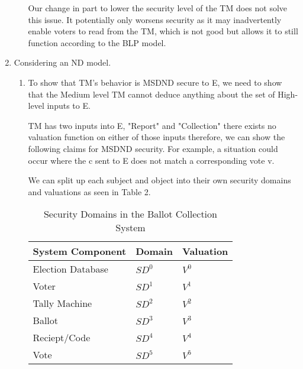 \documentclass[journal,onecolumn]{IEEEtran}
\begin{document}
\begin{enumerate}
\begin{enumerate}
      Our change in part to lower the security level of the TM does not solve this issue. It potentially only worsens security as it may inadvertently enable voters to read from the TM, which is not good but allows it to still function according to the BLP model. 
    \end{enumerate}

  \item Considering an ND model. 
    \begin{enumerate}
      \item To show that TM's behavior is MSDND secure to E, we need to show that the Medium level TM cannot deduce anything about the set of High-level inputs to E.
      
      TM has two inputs into E, "Report" and "Collection" there exists no valuation function on either of those inputs therefore, we can show the following claims for MSDND security. For example, a situation could occur where the c sent to E does not match a corresponding vote v. 

      We can split up each subject and object into their own security domains and valuations as seen in Table 2. 

      \begin{table}[H]
        \caption{Security Domains in the Ballot Collection System}
        \label{tab:security-domains}
        \centering
        \begin{tabular}{lll}
        \hline
        \textbf{System Component} & \textbf{Domain} & \textbf{Valuation} \\
        \hline
        Election Database           & $SD^{0}$       & $V^{0}$     \\
        Voter                       & $SD^{1}$       & $V^{1}$          \\
        Tally Machine               & $SD^{2}$       & $V^{2}$           \\
        Ballot                      & $SD^{3}$       & $V^{3}$           \\
        Reciept/Code                & $SD^{4}$       & $V^{4}$          \\
        Vote                        & $SD^{5}$       & $V^{5}$          
        \end{tabular}
      \end{table}
      

\end{enumerate}
\end{enumerate}
\end{document}
